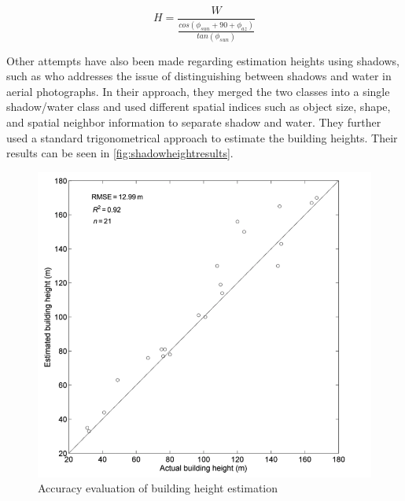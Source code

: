 \begin{equation}
	H=\frac{W}{\frac{cos(\phi_{sun}+90+\phi_{az})}{tan(\phi_{sun})}}
	\label{eq:shadowheight}
\end{equation}

Other attempts have also been made regarding estimation heights using shadows, such as \cite{Shao2011} who addresses the issue of distinguishing between shadows and water in aerial photographs. In their approach, they merged the two classes into a single shadow/water class and used different spatial indices such as object size, shape, and spatial neighbor information to separate shadow and water. They further used a standard trigonometrical approach to estimate the building heights. Their results can be seen in \autoref{fig:shadowheightresults}.

\begin{figure}[!h]
	\centering
	\includegraphics[scale=0.4]{fig/shadow_height_results.png}
	\caption{Accuracy evaluation of building height estimation \citep{Shao2011}}
	\label{fig:shadowheightresults}
\end{figure}